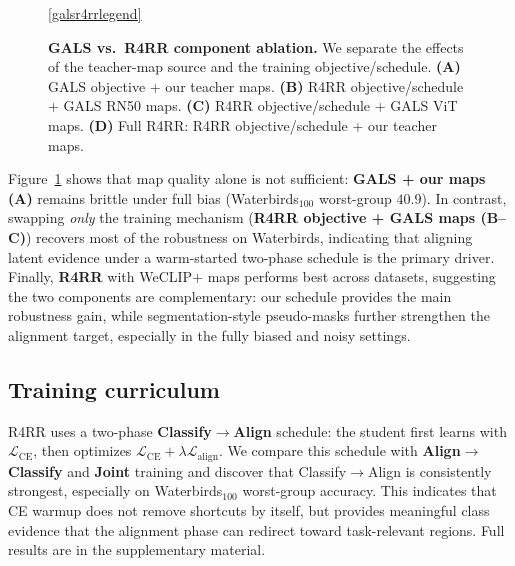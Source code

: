 \begin{figure}[t]

\vspace{0.1em}
\ref{galsr4rrlegend}

\vspace{-0.5em}
\caption{
\textbf{GALS vs.\ R4RR component ablation.}
We separate the effects of the teacher-map source and the training objective/schedule.
\textbf{(A)} GALS objective + our teacher maps.
\textbf{(B)} R4RR objective/schedule + GALS RN50 maps.
\textbf{(C)} R4RR objective/schedule + GALS ViT maps.
\textbf{(D)} Full R4RR: R4RR objective/schedule + our teacher maps.
}
\label{fig:gals_r4rr_ablation}
\end{figure}


Figure~\ref{fig:gals_r4rr_ablation} shows that map quality alone is not sufficient: \textbf{GALS + our maps (A)} remains brittle under full bias (Waterbirds$_{100}$ worst-group $40.9$). In contrast, swapping \emph{only} the training mechanism (\textbf{R4RR objective + GALS maps (B--C)}) recovers most of the robustness on Waterbirds, indicating that aligning {latent} evidence under a warm-started two-phase schedule is the primary driver. Finally, \textbf{R4RR} with WeCLIP+ maps performs best across datasets, suggesting the two components are complementary: our schedule provides the main robustness gain, while segmentation-style pseudo-masks further strengthen the alignment target, especially in the fully biased and noisy settings.


\subsection{Training curriculum}
\label{sec:ablationtrainingcuriculum}

R4RR uses a two-phase \textbf{Classify$\rightarrow$Align} schedule: the student first learns with $\mathcal{L}_{\mathrm{CE}}$, then optimizes $\mathcal{L}_{\mathrm{CE}}+\lambda\mathcal{L}_{\mathrm{align}}$. We compare this schedule with \textbf{Align$\rightarrow$Classify} and \textbf{Joint} training and discover that Classify$\rightarrow$Align is consistently strongest, especially on Waterbirds$_{100}$ worst-group accuracy. This indicates that CE warmup does not remove shortcuts by itself, but provides meaningful class evidence that the alignment phase can redirect toward task-relevant regions. Full results are in the supplementary material.

